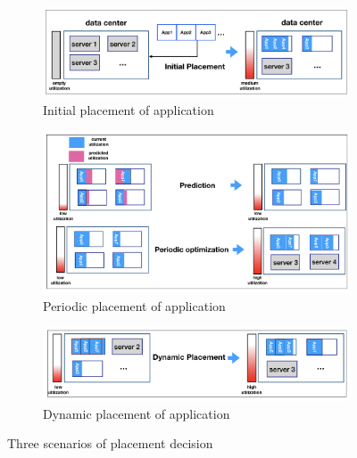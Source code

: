 
\begin{figure}
	\centering
	\begin{subfigure}[b]{0.9\textwidth}
		\includegraphics[width=\textwidth]{pics/initial_placement.png}
		\caption{Initial placement of application}
	\end{subfigure}
	\begin{subfigure}[b]{0.9\textwidth}
		\includegraphics[width=\textwidth]{pics/periodic_optimization.png}
	\caption{Periodic placement of application}
	\end{subfigure}
	\begin{subfigure}[b]{0.9\textwidth}
		\includegraphics[width=\textwidth]{pics/dynamic_placement.png}
	\caption{Dynamic placement of application}
	\end{subfigure}
	\caption{Three scenarios of placement decision}
	\label{fig:management}
\end{figure}

